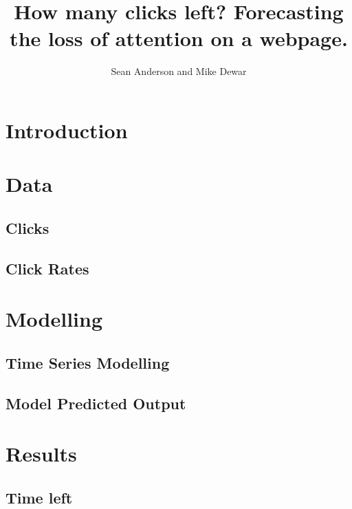 \documentclass{article}
\title{How many clicks left? Forecasting the loss of attention on a webpage.}
\author{Sean Anderson and Mike Dewar}
\begin{document}
    
    \section{Introduction}
    
    \section{Data}
    
    \subsection{Clicks}
    
    \subsection{Click Rates}
    
    \section{Modelling}
    
    \subsection{Time Series Modelling}
    
    \subsection{Model Predicted Output}
    
    \section{Results}
    
    \subsection{Time left }
    
    \section{}
    
\end{document}

